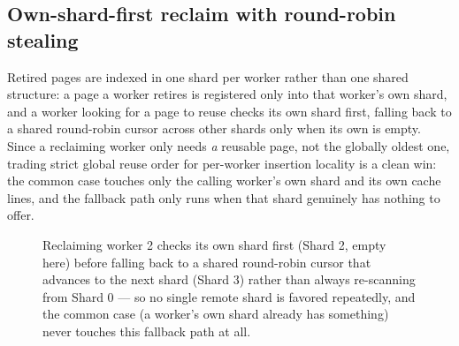 \documentclass[11pt]{article}
\begin{document}
\subsection{Own-shard-first reclaim with round-robin stealing}

Retired pages are indexed in one shard per worker rather than one shared structure:
a page a worker retires is registered only into that worker's own shard, and a
worker looking for a page to reuse checks its own shard first, falling back to a
shared round-robin cursor across other shards only when its own is empty. Since a
reclaiming worker only needs \emph{a} reusable page, not the globally oldest one,
trading strict global reuse order for per-worker insertion locality is a clean
win: the common case touches only the calling worker's own shard and its own cache
lines, and the fallback path only runs when that shard genuinely has nothing to
offer.

\begin{figure}[h]
\centering
{}
\caption{Reclaiming worker 2 checks its own shard first (Shard 2, empty here) before
  falling back to a shared round-robin cursor that advances to the next shard
  (Shard 3) rather than always re-scanning from Shard 0 --- so no single remote
  shard is favored repeatedly, and the common case (a worker's own shard already
  has something) never touches this fallback path at all.}
\label{fig:gc-shards}
\end{figure}
\end{document}
